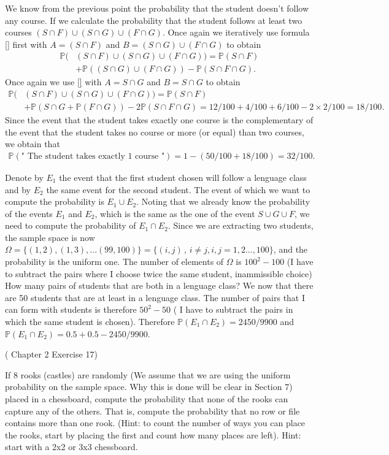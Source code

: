 \documentclass[12pt]{article}
\newcommand{\<}{{\langle \!\! \langle}}
\renewcommand{\>}{{\rangle \!\! \rangle}}
\newcommand{\bel}[2]{\begin{equation} \label{#1} \begin{split} #2
 					\end{split} \end{equation}}
\begin{document}
\begin{ExerciseList}
	\Question We know from the previous point the probability that the student doesn't follow any course. If we calculate the probability that the student follows at least two courses $ (S \cap F) \cup (S \cap G) \cup  (F \cap G)$. 
	Once again we iteratively use formula \eqref{} first with $A= (S \cap F)$ and $B= (S \cap G)\cup (F \cap G)$ to obtain 
	\bel{}{\mathbb{P}( & (S \cap F) \cup (S \cap G) \cup  (F \cap G)) = \mathbb{P}( S \cap F) \\ & + \mathbb{P}((S \cap G)\cup ( F\cap G))- \mathbb{P}(S \cap F \cap G).}
	Once again we use \eqref{} with $A= S \cap G$ and $B = S\cap G$ to obtain  
	\bel{}{\mathbb{P}( & (S \cap F) \cup (S \cap G) \cup  (F \cap G)) = \mathbb{P}( S \cap F) \\ & + \mathbb{P}(S \cap G+ \mathbb{P}( F\cap G))- 2\mathbb{P}(S \cap F \cap G)= 12/100+4/100+6/100- 2 \times 2/100=18/100.}
	Since the event that the student takes exactly one course is the complementary of the event that the student takes no course or more (or equal) than two courses,  we obtain that 
	\bel{}{\mathbb{P}(\textrm{" The student takes exactly 1 course "}) = 1- (50/100+ 18/100)= 32/100. }


	\Question Denote by $E_1$ the event that the first student chosen will follow a lenguage class and by $E_2$ the same event for the second student. The event of which we want to compute the probability is $E_1 \cup E_2$. Noting that we already know the probability of the events $E_1$ and $E_2$, which is the same as the one of the event $S \cup G \cup F$, we need to compute the probability of $E_1 \cap E_2$. Since we are extracting two students, the sample space is now $\Omega = \{(1,2),(1,3),...(99,100)\} = \{(i,j)\,,\, i \ne j, i,j=1,2...,100\}$, and the probability is the uniform one. The number of elements of $\Omega$ is $100^2 - 100$ (I have to subtract the pairs where I choose twice the same student, inammissible choice) How many pairs of students that are both in a lenguage class? We now that there are 50 students that are at least in a lenguage class. The number of pairs that I can form with students is therefore $50^2-50$ ( I have to subtract the pairs in which the same student is chosen). Therefore $\mathbb{P}(E_1 \cap E_2) = 2450/9900$ and $\mathbb{P}(E_1 \cap E_2) = 0.5+0.5- 2450/9900$. 

\Exercise  (\cite{Ross} Chapter 2 Exercise 17)  


If 8 rooks (castles) are randomly (We assume that we are using the uniform probability on the sample space. Why this is done will be clear in Section 7) placed in a chessboard, compute the probability that none of the rooks can capture any of the others. That is, compute the probability that no row or file contains more than one rook. (Hint: to count the number of ways you can place the rooks, start by placing the first and count how many places are left). Hint: start with a 2x2 or 3x3 chessboard. 


\end{ExerciseList}
\end{document}
